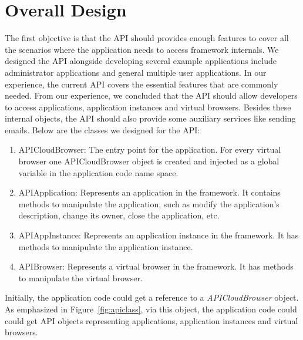 \section{Overall Design}
The first objective is that the API should provides
enough features to cover all the scenarios where the application needs
to access framework internals.
We designed the API alongside developing several example applications
include administrator applications and general multiple user applications.
In our experience, the current API covers the essential features that are commonly
needed.
From our experience, we concluded that the API should allow developers to access
applications, application instances and virtual browsers.
Besides these internal objects, the API should also provide some auxiliary services
like sending emails.
Below are the classes we designed for the API:
\begin{enumerate}
\item APICloudBrowser: 
The entry point for the application.
For every virtual browser one APICloudBrowser object is created and injected as
a global variable in the application code name space.

\item APIApplication: Represents an application in the framework.
It contains methods to manipulate the application, such as modify the application's
description, change its owner, close the application, etc.

\item APIAppInstance: Represents an application instance in the framework.
It has methods to manipulate the application instance.

\item APIBrowser: Represents a virtual browser in the framework.
It has methods to manipulate the virtual browser.

\end{enumerate}

\apiclassfig{}

Initially, the application code could get a reference to a \emph{APICloudBrowser} object.
As emphasized in Figure~\ref{fig:apiclass}, 
via this object, the application code could
could get API objects
representing applications, application instances and virtual browsers.


